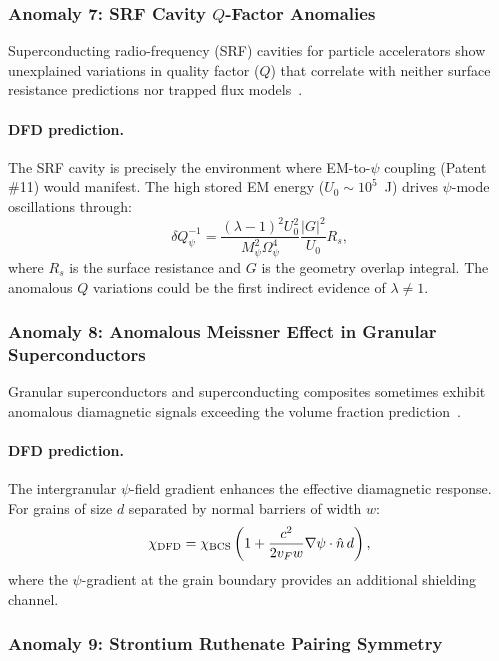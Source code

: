 \documentclass[aps,prb,twocolumn,superscriptaddress,floatfix,nofootinbib,longbibliography]{revtex4-2}
\newcommand{\Opsi}{\Omega_\psi}
\newcommand{\Mpsi}{M_\psi}
\begin{document}
\subsubsection{Anomaly 7: SRF Cavity $Q$-Factor Anomalies}

Superconducting radio-frequency (SRF) cavities for particle accelerators
show unexplained variations in quality factor ($Q$) that correlate with
neither surface resistance predictions nor trapped flux
models~\cite{Romanenko2013,Gurevich2017}.

\paragraph{DFD prediction.}
The SRF cavity is precisely the environment where EM-to-$\psi$ coupling
(Patent \#11) would manifest.  The high stored EM energy
($U_0 \sim 10^5$~J) drives $\psi$-mode oscillations through:
\begin{equation}
\delta Q^{-1}_\psi = \frac{(\lambda - 1)^2 U_0^2}{\Mpsi^2\Opsi^4}
\frac{|G|^2}{U_0}R_s,
\label{eq:srf-q}
\end{equation}
where $R_s$ is the surface resistance and $G$ is the geometry overlap
integral.  The anomalous $Q$ variations could be the first indirect
evidence of $\lambda \neq 1$.

\subsubsection{Anomaly 8: Anomalous Meissner Effect in Granular Superconductors}

Granular superconductors and superconducting composites sometimes exhibit
anomalous diamagnetic signals exceeding the volume fraction
prediction~\cite{Shenoy1991,Gerber1993}.

\paragraph{DFD prediction.}
The intergranular $\psi$-field gradient enhances the effective
diamagnetic response.  For grains of size $d$ separated by normal
barriers of width $w$:
\begin{equation}
\chi_{\rm DFD} = \chi_{\rm BCS}\left(1 + \frac{c^2}{2v_F w}
\nabla\psi\cdot\hat{n}\,d\right),
\label{eq:granular}
\end{equation}
where the $\psi$-gradient at the grain boundary provides an additional
shielding channel.

\subsubsection{Anomaly 9: Strontium Ruthenate Pairing Symmetry}
\end{document}
